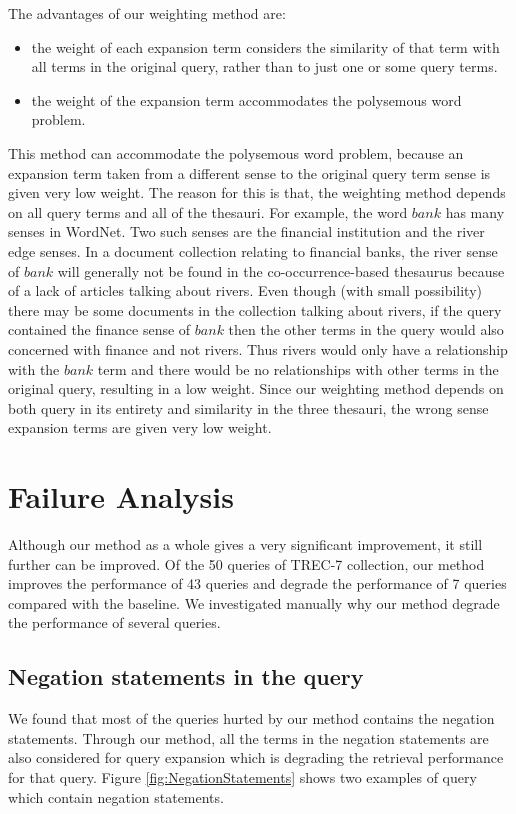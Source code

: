 The advantages of our weighting method are:
\begin{itemize}
\item the weight of each  expansion term considers the similarity of that term with all terms in the original query, rather than to just one or some query terms. 

\item the weight of the expansion term accommodates the polysemous word problem.
\end{itemize}
This method  can accommodate the polysemous word problem, because an
expansion term  taken from a different sense to  the original query term
sense is given  very low weight. The reason for this is that,  the weighting
method depends on  all query terms and all of the thesauri.  For
example, the word $bank$ has many senses in WordNet. Two such senses are the
financial institution and the river edge senses. In a document
collection relating to  financial banks,  the river sense of $bank$
will generally not be found in the co-occurrence-based thesaurus because
of a lack of articles talking about  rivers. Even though (with small
possibility)  there may be  some documents in the collection talking
about  rivers, if the query contained the finance sense of $bank$ then
the other terms in the query would also concerned with finance and not
rivers. Thus  rivers would only have  a relationship with  the $bank$
term  and there would be no relationships with  other terms in the
 original query, resulting in a low  weight.  Since our weighting method
depends on both query in its entirety and  similarity in the three thesauri, the wrong sense  expansion terms are given very low weight.

\newpage
\section{Failure Analysis}
Although our method as a whole gives a very significant improvement, it still further can be improved. Of the 50 queries of TREC-7 collection, our method improves the performance of 43 queries and degrade the performance of 7 queries compared with the baseline. We investigated manually why our method degrade the performance of several queries. 

\subsection{Negation statements in the query}
We found that most of the queries hurted by our method contains the negation statements.
Through our method, all the terms in the negation statements are also considered for query expansion which is degrading the retrieval  performance for that query. Figure \ref{fig:NegationStatements} shows two examples of  query which contain negation statements.


